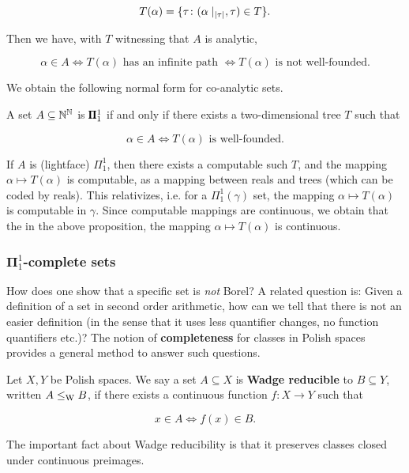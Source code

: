 \begin{equation}
T(\alpha) = \{ \tau \colon (\alpha\mid_{|\tau|}, \tau) \in T \}.
\end{equation}

Then we have, with $T$ witnessing that $A$ is analytic,

\begin{equation}
\alpha \in A \iff T(\alpha) \text{ has an infinite path } \iff T(\alpha) \text{ is not well-founded}.
\end{equation}

We obtain the following normal form for co-analytic sets.

\begin{proposition}\label{prop-norm-form-coanalytic}A set $A \subseteq \mathbb{N}^{\mathbb{N}}$ is $\pmb{\Pi}^1_{1}$ if and only if there exists a two-dimensional tree $T$ such that

\begin{equation}
\alpha \in A \iff T(\alpha) \text{ is well-founded}.
\end{equation}

\end{proposition}If $A$ is (lightface) $\Pi^1_1$, then there exists a computable such $T$, and the mapping $\alpha \mapsto T(\alpha)$ is computable, as a mapping between reals and trees (which can be coded by reals). This relativizes, i.e. for a $\Pi^1_1(\gamma)$ set, the mapping $\alpha \mapsto T(\alpha)$ is computable in $\gamma$. Since computable mappings are continuous, we obtain that the in the above proposition, the mapping $\alpha \mapsto T(\alpha)$ is continuous.

\subsubsection{$\mathbf{\Pi}^1_1$-complete sets}

How does one show that a specific set is \textit{not} Borel? A related question is: Given a definition of a set in second order arithmetic, how can we tell that there is not an easier definition (in the sense that it uses less quantifier changes, no function quantifiers etc.)? The notion of \textbf{completeness} for classes in Polish spaces provides a general method to answer such questions.

\begin{definition}\label{def-wadge}Let $X,Y$ be Polish spaces. We say a set $A \subseteq X$ is \textbf{Wadge reducible} to $B \subseteq Y$, written $A \leq_{\operatorname{W}} B$, if there exists a continuous function $f: X \to Y$ such that

\begin{equation}
x \in A \iff f(x) \in B.
\end{equation}

\end{definition}The important fact about Wadge reducibility is that it preserves classes closed under continuous preimages.

